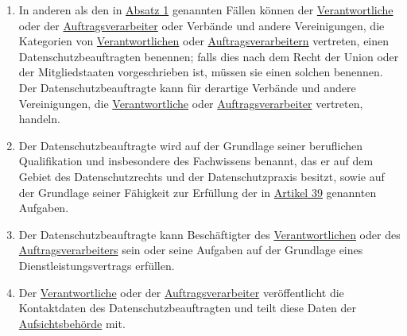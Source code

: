 \begin{enumerate}
  \item In anderen als den in \hyperref[itm:37-1]{Absatz 1} genannten Fällen können der \hyperref[itm:04-7]
   {Verantwortliche} oder der
   \hyperref[itm:04-8]{Auftragsverarbeiter} oder Verbände und andere Vereinigungen, die Kategorien von \hyperref
    [itm:04-7]{Verantwortlichen} oder
   \hyperref[itm:04-8]{Auftragsverarbeitern} vertreten, einen Datenschutzbeauftragten benennen; falls dies nach dem
    Recht der Union oder der Mitgliedstaaten vorgeschrieben ist, müssen sie einen solchen benennen. Der
    Datenschutzbeauftragte kann für derartige Verbände und andere Vereinigungen, die \hyperref[itm:04-7]
    {Verantwortliche} oder \hyperref[itm:04-8]{Auftragsverarbeiter} vertreten, handeln.%
  \label{itm:37-4}

  \item Der Datenschutzbeauftragte wird auf der Grundlage seiner beruflichen Qualifikation und insbesondere des
   Fachwissens benannt, das er auf dem Gebiet des Datenschutzrechts und der Datenschutzpraxis besitzt, sowie auf der
   Grundlage seiner Fähigkeit zur Erfüllung der in \hyperref[ch:39]{Artikel 39} genannten Aufgaben.%
  \label{itm:37-5}

  \item Der Datenschutzbeauftragte kann Beschäftigter des \hyperref[itm:04-7]{Verantwortlichen} oder des \hyperref
   [itm:04-8]{Auftragsverarbeiters} sein oder seine Aufgaben auf der Grundlage eines Dienstleistungsvertrags erfüllen.%
  \label{itm:37-6}

  \item Der \hyperref[itm:04-7]{Verantwortliche} oder der \hyperref[itm:04-8]{Auftragsverarbeiter} veröffentlicht die
   Kontaktdaten des Datenschutzbeauftragten und teilt diese Daten der \hyperref[itm:04-21]{Aufsichtsbehörde} mit.%
  \label{itm:37-7}

\end{enumerate}


